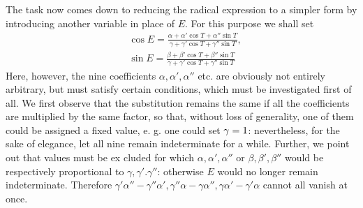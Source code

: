 \begingroup
\renewcommand{\arraystretch}{1.45}
The task now comes down to reducing the radical expression to a simpler form by introducing another variable in place of $E$. For this purpose we shall set
\[
\begin{aligned}
&\cos E=\frac{\alpha+\alpha'\cos T+\alpha''\sin T}{\gamma+\gamma'\cos T+\gamma''\sin T},\\[6pt]
&
\sin E=\frac{\beta+\beta'\cos T+\beta''\sin T}{\gamma+\gamma'\cos T+\gamma''\sin T}
\end{aligned}
\]
Here, however, the nine coefficients $\alpha,\alpha',\alpha''$ etc. are obviously not entirely arbitrary, but must satisfy certain conditions, which must be investigated first of all. We first observe that the substitution remains the same if all the coefficients are multiplied by the same factor, so that, without loss of generality, one of them could be assigned a fixed value, e. g. one could set $\gamma=\nobreak{}1$: nevertheless, for the sake of elegance, let all nine remain indeterminate for a while. Further, we point out that values must be ex%
cluded for which $\alpha,\alpha',\alpha''$ or $\beta,\beta',\beta''$ would be respectively proportional to $\gamma,\gamma'.\gamma''$: otherwise $E$ would no longer remain indeterminate. Therefore $\gamma'\alpha''-\gamma''\alpha',\gamma''\alpha-\gamma\alpha'',\gamma\alpha'-\gamma'\alpha$ cannot all vanish at once.

